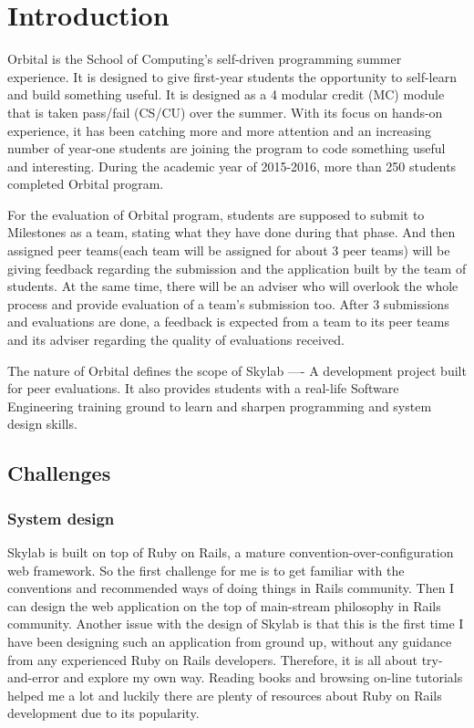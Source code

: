 \chapter{Introduction}

Orbital is the School of Computing’s self-driven programming summer experience. It is designed to give first-year students the opportunity to self-learn and build something useful. It is designed as a 4 modular credit (MC) module that is taken pass/fail (CS/CU) over the summer. With its focus on hands-on experience, it has been catching more and more attention and an increasing number of year-one students are joining the program to code something useful and interesting. During the academic year of 2015-2016, more than 250 students completed Orbital program.

For the evaluation of Orbital program, students are supposed to submit to Milestones as a team, stating what they have done during that phase. And then assigned peer teams(each team will be assigned for about 3 peer teams) will be giving feedback regarding the submission and the application built by the team of students. At the same time, there will be an adviser who will overlook the whole process and provide evaluation of a team's submission too. After 3 submissions and evaluations are done, a feedback is expected from a team to its peer teams and its adviser regarding the quality of evaluations received.

The nature of Orbital defines the scope of Skylab —- A development project built for peer evaluations. It also provides students with a real-life Software Engineering training ground to learn and sharpen programming and system design skills. 

\section{Challenges}

\subsection{System design}
Skylab is built on top of Ruby on Rails, a mature convention-over-configuration web framework. So the first challenge for me is to get familiar with the conventions and recommended ways of doing things in Rails community. Then I can design the web application on the top of main-stream philosophy in Rails community. Another issue with the design of Skylab is that this is the first time I have been designing such an application from ground up, without any guidance from any experienced Ruby on Rails developers. Therefore, it is all about try-and-error and explore my own way. Reading books and browsing on-line tutorials helped me a lot and luckily there are plenty of resources about Ruby on Rails development due to its popularity.
